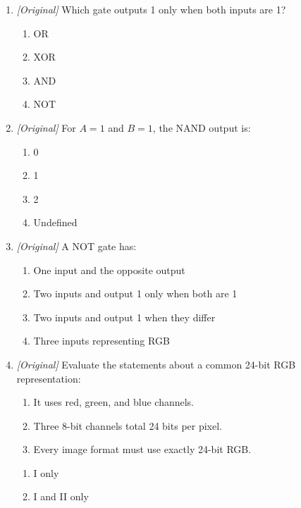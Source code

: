 \documentclass[11pt]{article}
\begin{document}
\begin{enumerate}[label=\textbf{Q\arabic*.}, leftmargin=*]
  XOR?
  \begin{enumerate}[label=\Alph*.]
    \item 0
    \item 1
    \item 2
    \item It depends on a clock
  \end{enumerate}
\item \textit{[Original]} Which gate outputs 1 only when both inputs are 1?
  \begin{enumerate}[label=\Alph*.]
    \item OR
    \item XOR
    \item AND
    \item NOT
  \end{enumerate}
\item \textit{[Original]} For $A=1$ and $B=1$, the NAND output is:
  \begin{enumerate}[label=\Alph*.]
    \item 0
    \item 1
    \item 2
    \item Undefined
  \end{enumerate}
\item \textit{[Original]} A NOT gate has:
  \begin{enumerate}[label=\Alph*.]
    \item One input and the opposite output
    \item Two inputs and output 1 only when both are 1
    \item Two inputs and output 1 when they differ
    \item Three inputs representing RGB
  \end{enumerate}
\item \textit{[Original]} Evaluate the statements about a common 24-bit RGB
  representation:
  \begin{enumerate}[label=\Roman*.]
    \item It uses red, green, and blue channels.
    \item Three 8-bit channels total 24 bits per pixel.
    \item Every image format must use exactly 24-bit RGB.
  \end{enumerate}
  \begin{enumerate}[label=\Alph*.]
    \item I only
    \item I and II only

\end{enumerate}
\end{enumerate}
\end{document}
